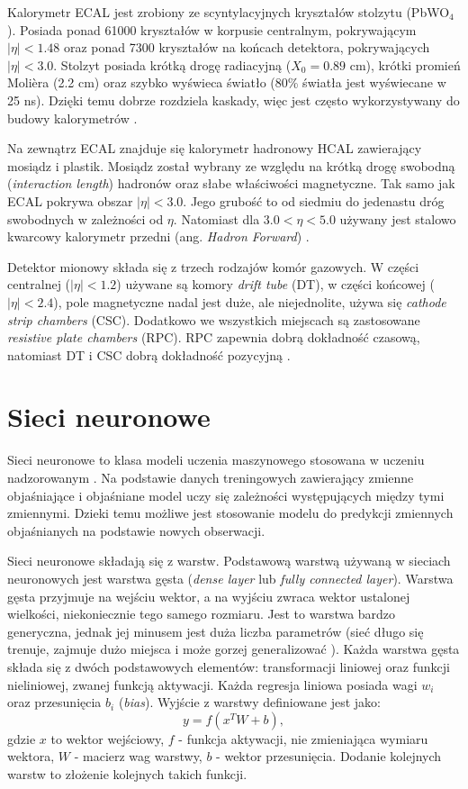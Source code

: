 \documentclass{pracalicmgr}
\begin{document}
	Kalorymetr ECAL jest zrobiony ze scyntylacyjnych kryształów stolzytu (PbWO$_4$). Posiada ponad 61000 kryształów w korpusie centralnym, pokrywającym $|\eta| < 1.48$ oraz ponad 7300 kryształów na końcach detektora, pokrywających $|\eta| < 3.0$. Stolzyt posiada krótką drogę radiacyjną ($X_0 = 0.89$ cm), krótki promień Molièra (2.2 cm) oraz szybko wyświeca światło (80\% światła jest wyświecane w 25 ns). Dzięki temu dobrze rozdziela kaskady, więc jest często wykorzystywany do budowy kalorymetrów \cite{cms_technical}.
	
	Na zewnątrz ECAL znajduje się kalorymetr hadronowy HCAL zawierający mosiądz i plastik. Mosiądz został wybrany ze względu na krótką drogę swobodną (\textit{interaction length}) hadronów oraz słabe właściwości magnetyczne.
Tak samo jak ECAL pokrywa obszar $|\eta| < 3.0$. Jego grubość to od siedmiu do jedenastu dróg swobodnych w zależności od $\eta$. Natomiast dla $3.0 < \eta < 5.0$ używany jest stalowo kwarcowy kalorymetr przedni (ang. \textit{Hadron Forward}) \cite{cms_technical}.
	
	Detektor mionowy składa się z trzech rodzajów komór gazowych. W części centralnej ($|\eta| < 1.2$) używane są komory \textit{drift tube} (DT), w części końcowej ($|\eta| < 2.4$), pole magnetyczne nadal jest duże, ale niejednolite, używa się \textit{cathode strip chambers} (CSC). Dodatkowo we wszystkich miejscach są zastosowane \textit{resistive plate chambers} (RPC). RPC zapewnia dobrą dokładność czasową, natomiast DT i CSC dobrą dokładność pozycyjną \cite{cms_technical}.
	
	\section{Sieci neuronowe}
	Sieci neuronowe to klasa modeli uczenia maszynowego stosowana w uczeniu nadzorowanym \cite{dl}. Na podstawie danych treningowych zawierający zmienne objaśniające i objaśniane model uczy się zależności występujących między tymi zmiennymi. Dzieki temu możliwe jest stosowanie modelu do predykcji zmiennych objaśnianych na podstawie nowych obserwacji.
	
	Sieci neuronowe składają się z warstw. Podstawową warstwą używaną w sieciach neuronowych jest warstwa gęsta (\textit{dense layer} lub \textit{fully connected layer}). Warstwa gęsta przyjmuje na wejściu wektor, a na wyjściu zwraca wektor ustalonej wielkości, niekoniecznie tego samego rozmiaru. Jest to warstwa bardzo generyczna, jednak jej minusem jest duża liczba parametrów (sieć długo się trenuje, zajmuje dużo miejsca i może gorzej generalizować \cite{dl}). Każda warstwa gęsta składa się z dwóch podstawowych elementów: transformacji liniowej oraz funkcji nieliniowej, zwanej funkcją aktywacji. Każda regresja liniowa posiada wagi $w_i$ oraz przesunięcia $b_i$ (\textit{bias}). Wyjście z warstwy definiowane jest jako: $$y = f(x^TW + b),$$ gdzie $x$ to wektor wejściowy, $f$ - funkcja aktywacji, nie zmieniająca wymiaru wektora, $W$ - macierz wag warstwy, $b$ - wektor przesunięcia. Dodanie kolejnych warstw to złożenie kolejnych takich funkcji.
	
\end{document}
